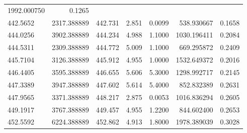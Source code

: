 \documentclass[czech,11pt,a4paper]{article}
\begin{document}
\begin{table}[H]
\begin{tabular}{lrlllrl}
1992.000750 &                 0.1265 \\                        442.5652 &              2317.388889 &                      442.731 &       2.851 &                               0.0099 &               538.930667 &                 0.1658 \\                        444.0256 &              3902.388889 &                      444.234 &       4.988 &                               1.1000 &              1030.196411 &                 0.2084 \\                        444.5311 &              2309.388889 &                      444.772 &       5.009 &                               1.1000 &               669.295872 &                 0.2409 \\                        445.7104 &              3126.388889 &                      445.912 &       4.955 &                               1.0000 &              1532.649372 &                 0.2016 \\                        446.4405 &              3595.388889 &                      446.655 &       5.606 &                               5.3000 &              1298.992717 &                 0.2145 \\                        447.3389 &              3947.388889 &                      447.602 &       5.614 &                               5.4000 &               852.832389 &                 0.2631 \\                        447.9565 &              3371.388889 &                      448.217 &       2.875 &                               0.0053 &              1016.836294 &                 0.2605 \\                      449.1917 &              3767.388889 &                      449.457 &       4.955 &                               1.2200 &               844.602400 &                 0.2653 \\                        452.5592 &              6224.388889 &                      452.862 &       4.913 &                               1.8000 &              1978.389039 &                 0.3028 \\
				\end{tabular}
			\end{table}
			
\end{document}
